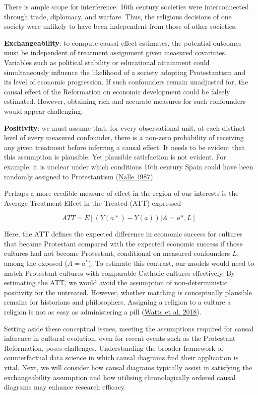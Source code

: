 \documentclass[
  singlecolumn]{article}
\begin{document}
There is ample scope for interference: 16th century societies were
interconnected through trade, diplomacy, and warfare. Thus, the
religious decisions of one society were unlikely to have been
independent from those of other societies.

\textbf{Exchangeability}: to compute causal effect estimates, the
potential outcomes must be independent of treatment assignment given
measured covariates. Variables such as political stability or
educational attainment could simultaneously influence the likelihood of
a society adopting Protestantism and its level of economic progression.
If such confounders remain unadjusted for, the causal effect of the
Reformation on economic development could be falsely estimated. However,
obtaining rich and accurate measures for such confounders would appear
challenging.

\textbf{Positivity}: we must assume that, for every observational unit,
at each distinct level of every measured confounder, there is a non-zero
probability of receiving any given treatment before inferring a causal
effect. It needs to be evident that this assumption is plausible. Yet
plausible satisfaction is not evident. For example, it is unclear under
which conditions 16th century Spain could have been randomly assigned to
Protestantism (\protect\hyperlink{ref-nalle1987}{Nalle 1987}).

Perhaps a more credible measure of effect in the region of our interests
is the Average Treatment Effect in the Treated (ATT) expressed

\[ATT = E[(Y(a*)- Y(a))|A = a*,L]\]

Here, the ATT defines the expected difference in economic success for
cultures that became Protestant compared with the expected economic
success if those cultures had not become Protestant, conditional on
measured confounders \(L\), among the exposed (\(A = a^*\)). To estimate
this contrast, our models would need to match Protestant cultures with
comparable Catholic cultures effectively. By estimating the ATT, we
would avoid the assumption of non-deterministic positivity for the
untreated. However, whether matching is conceptually plausible remains
for historians and philosophers. Assigning a religion to a culture a
religion is not as easy as administering a pill
(\protect\hyperlink{ref-watts2018}{Watts et al. 2018}).

Setting aside these conceptual issues, meeting the assumptions required
for causal inference in cultural evolution, even for recent events such
as the Protestant Reformation, poses challenges. Understanding the
broader framework of counterfactual data science in which causal
diagrams find their application is vital. Next, we will consider how
causal diagrams typically assist in satisfying the exchangeability
assumption and how utilising chronologically ordered causal diagrams may
enhance research efficacy.
\end{document}
